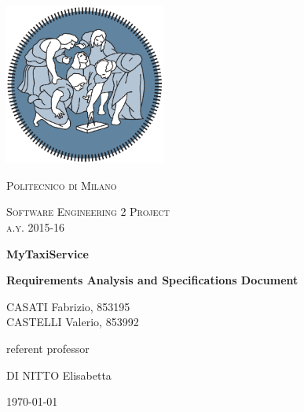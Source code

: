 



%
%    

\begin{titlepage}
	\centering
	\includegraphics[width=150pt]{polimi_logo}\par\vspace{1cm}
	{\scshape\LARGE
		Politecnico di Milano\par}
	\vspace{1cm}
	{\scshape\Large
		Software Engineering 2 Project\\
		a.y. 2015-16\par}
	\vspace{1.5cm}
	{\huge\bfseries
		MyTaxiService\\\par}
	{\Large\bfseries
		Requirements Analysis and Specifications Document\par}
	\vspace{2cm}
	{\Large
		CASATI Fabrizio, 853195\\
		CASTELLI Valerio, 853992\par}
	\vfill
	referent professor\par
	DI NITTO Elisabetta

	\vfill

	{\large \today\par}
\end{titlepage}

